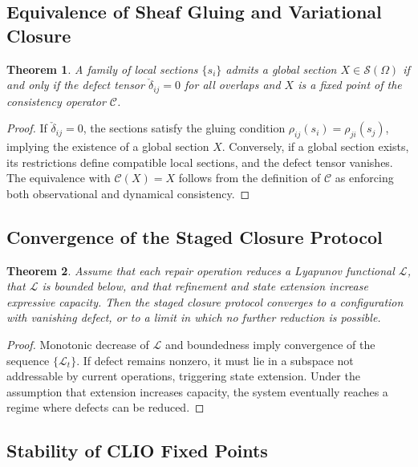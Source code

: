 \documentclass[12pt, oneside]{article}
\newtheorem{theorem}{Theorem}
\begin{document}
\subsection{Equivalence of Sheaf Gluing and Variational Closure}

\begin{theorem}
A family of local sections $\{s_i\}$ admits a global section $X \in \mathcal{S}(\Omega)$ if and only if the defect tensor $\check{\delta}_{ij} = 0$ for all overlaps and $X$ is a fixed point of the consistency operator $\mathcal{C}$.
\end{theorem}

\begin{proof}
If $\check{\delta}_{ij} = 0$, the sections satisfy the gluing condition $\rho_{ij}(s_i) = \rho_{ji}(s_j)$, implying the existence of a global section $X$. Conversely, if a global section exists, its restrictions define compatible local sections, and the defect tensor vanishes. The equivalence with $\mathcal{C}(X) = X$ follows from the definition of $\mathcal{C}$ as enforcing both observational and dynamical consistency.
\end{proof}

\subsection{Convergence of the Staged Closure Protocol}

\begin{theorem}
Assume that each repair operation reduces a Lyapunov functional $\mathcal{L}$, that $\mathcal{L}$ is bounded below, and that refinement and state extension increase expressive capacity. Then the staged closure protocol converges to a configuration with vanishing defect, or to a limit in which no further reduction is possible.
\end{theorem}

\begin{proof}
Monotonic decrease of $\mathcal{L}$ and boundedness imply convergence of the sequence $\{\mathcal{L}_t\}$. If defect remains nonzero, it must lie in a subspace not addressable by current operations, triggering state extension. Under the assumption that extension increases capacity, the system eventually reaches a regime where defects can be reduced.
\end{proof}

\subsection{Stability of CLIO Fixed Points}
\end{document}
